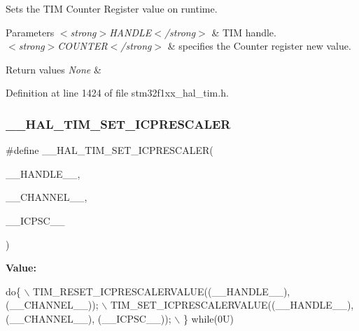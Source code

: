 Sets the T\+IM Counter Register value on runtime. 


\begin{DoxyParams}{Parameters}
{\em $<$strong$>$\+H\+A\+N\+D\+L\+E$<$/strong$>$} & T\+IM handle. \\
\hline
{\em $<$strong$>$\+C\+O\+U\+N\+T\+E\+R$<$/strong$>$} & specifies the Counter register new value. \\
\hline
\end{DoxyParams}

\begin{DoxyRetVals}{Return values}
{\em None} & \\
\hline
\end{DoxyRetVals}


Definition at line 1424 of file stm32f1xx\+\_\+hal\+\_\+tim.\+h.

\mbox{\label{group___t_i_m___exported___macros_gaeb106399b95ef02cec502f58276a0e92}} 
\subsubsection{\texorpdfstring{\+\_\+\+\_\+\+H\+A\+L\+\_\+\+T\+I\+M\+\_\+\+S\+E\+T\+\_\+\+I\+C\+P\+R\+E\+S\+C\+A\+L\+ER}{\_\_HAL\_TIM\_SET\_ICPRESCALER}}
{\footnotesize\ttfamily \#define \+\_\+\+\_\+\+H\+A\+L\+\_\+\+T\+I\+M\+\_\+\+S\+E\+T\+\_\+\+I\+C\+P\+R\+E\+S\+C\+A\+L\+ER(\begin{DoxyParamCaption}\item[{}]{\+\_\+\+\_\+\+H\+A\+N\+D\+L\+E\+\_\+\+\_\+,  }\item[{}]{\+\_\+\+\_\+\+C\+H\+A\+N\+N\+E\+L\+\_\+\+\_\+,  }\item[{}]{\+\_\+\+\_\+\+I\+C\+P\+S\+C\+\_\+\+\_\+ }\end{DoxyParamCaption})}

{\bfseries Value\+:}
\begin{DoxyCode}
\textcolor{keywordflow}{do}\{                                                    \(\backslash\)
                              TIM\_RESET\_ICPRESCALERVALUE((\_\_HANDLE\_\_), (\_\_CHANNEL\_\_));  \(\backslash\)
                              TIM\_SET\_ICPRESCALERVALUE((\_\_HANDLE\_\_), (\_\_CHANNEL\_\_), (\_\_ICPSC\_\_)); \(\backslash\)
                          \} \textcolor{keywordflow}{while}(0U)
\end{DoxyCode}


